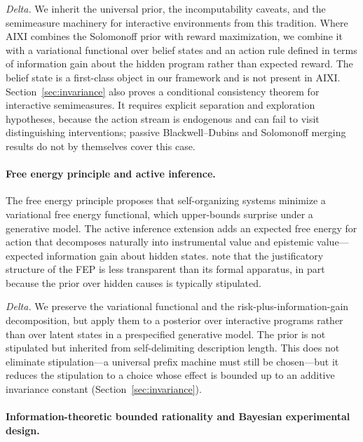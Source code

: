 \documentclass[11pt]{article}
\theoremstyle{remark}
\begin{document}
\textit{Delta.} We inherit the universal prior, the incomputability caveats, and the semimeasure machinery for interactive environments from this tradition. Where AIXI combines the Solomonoff prior with reward maximization, we combine it with a variational functional over belief states and an action rule defined in terms of information gain about the hidden program rather than expected reward. The belief state is a first-class object in our framework and is not present in AIXI. Section~\ref{sec:invariance} also proves a conditional consistency theorem for interactive semimeasures. It requires explicit separation and exploration hypotheses, because the action stream is endogenous and can fail to visit distinguishing interventions; passive Blackwell--Dubins and Solomonoff merging results do not by themselves cover this case.

\paragraph{Free energy principle and active inference.}

The free energy principle \citep{Friston2010} proposes that self-organizing systems minimize a variational free energy functional, which upper-bounds surprise under a generative model. The active inference extension \citep{FristonEtAl2017Process,FristonEtAl2017Curiosity,ParrFriston2019} adds an expected free energy for action that decomposes naturally into instrumental value and epistemic value---expected information gain about hidden states. \citet{ColombWright2021} note that the justificatory structure of the FEP is less transparent than its formal apparatus, in part because the prior over hidden causes is typically stipulated.

\textit{Delta.} We preserve the variational functional and the risk-plus-information-gain decomposition, but apply them to a posterior over interactive programs rather than over latent states in a prespecified generative model. The prior is not stipulated but inherited from self-delimiting description length. This does not eliminate stipulation---a universal prefix machine must still be chosen---but it reduces the stipulation to a choice whose effect is bounded up to an additive invariance constant (Section~\ref{sec:invariance}).

\paragraph{Information-theoretic bounded rationality and Bayesian experimental design.}
\end{document}
